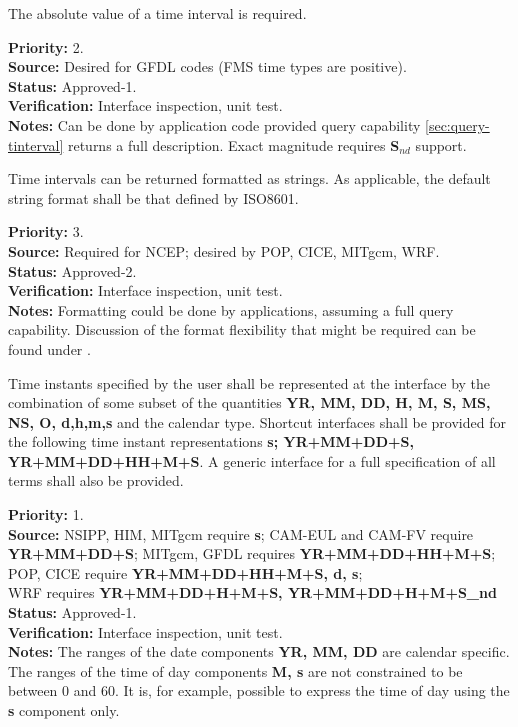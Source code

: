 The absolute value of a time interval is required.
\begin{reqlist}
{\bf Priority:} 2. \\
{\bf Source:} Desired for GFDL codes (FMS time types are positive). \\
{\bf Status:} Approved-1. \\
{\bf Verification:} Interface inspection, unit test. \\
{\bf Notes:}  Can be done by application code provided query capability 
\ref{sec:query-tinterval} returns a full description. 
Exact magnitude requires 
{\bf S$_{nd}$} support.
\end{reqlist}

Time intervals can be returned formatted as strings.  As applicable, the
default string format shall be that defined by ISO8601.
\begin{reqlist}
{\bf Priority:} 3. \\ 
{\bf Source:} Required for NCEP; desired by POP, CICE, MITgcm, WRF. \\
{\bf Status:} Approved-2. \\
{\bf Verification:} Interface inspection, unit test. \\
{\bf Notes:}  Formatting could be done by applications, assuming a full query 
capability.  Discussion of the format flexibility that might be required can be 
found under \cite{javaCalendar}.
\end{reqlist}

\label{req:time_instants}
\label{req:ti}

Time instants specified by the user shall be represented at the interface by the 
combination of some subset of the quantities {\bf YR, MM, DD, H, M, S, MS, NS, O,
d,h,m,s} 
and the calendar type.  Shortcut interfaces shall be provided for the following time 
instant representations {\bf s; YR+MM+DD+S, YR+MM+DD+HH+M+S}. A generic interface for a 
full specification of all terms shall also be provided.
\begin{reqlist}
{\bf Priority:} 1. \\
{\bf Source:} NSIPP, HIM, MITgcm require {\bf s}; 
CAM-EUL and CAM-FV require {\bf YR+MM+DD+S};
MITgcm, GFDL requires {\bf YR+MM+DD+HH+M+S}; 
POP, CICE require {\bf YR+MM+DD+HH+M+S, d, s}; \\
WRF requires {\bf YR+MM+DD+H+M+S, YR+MM+DD+H+M+S\_nd} \\
{\bf Status:} Approved-1. \\
{\bf Verification:} Interface inspection, unit test. \\
{\bf Notes:} The ranges of the date components {\bf YR, MM, DD} are
calendar specific.  The ranges of the time of day components {\bf M, s} are
not constrained to be between 0 and 60.  It is, for example, possible to
express the time of day using the {\bf s} component only.  
\end{reqlist}

